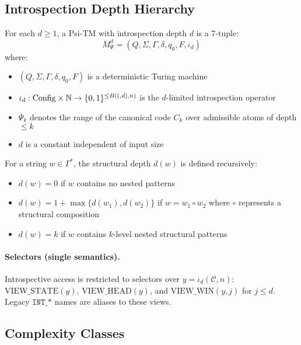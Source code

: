 \subsection{Introspection Depth Hierarchy}

\begin{definition}
For each $d \geq 1$, a Psi-TM with introspection depth $d$ is a 7-tuple:
$$M_\Psi^d = (Q, \Sigma, \Gamma, \delta, q_0, F, \iota_d)$$
where:
\begin{itemize}
\item $(Q, \Sigma, \Gamma, \delta, q_0, F)$ is a deterministic Turing machine
\item $\iota_d: \mathrm{Config}\times \mathbb{N} \to \{0,1\}^{\le B((,d),n)}$ is the $d$-limited introspection operator
\item $\Psi_k$ denotes the range of the canonical code $C_k$ over admissible atoms of depth $\le k$
\item $d$ is a constant independent of input size
\end{itemize}
\end{definition}

\begin{definition}
For a string $w \in \Gamma^*$, the structural depth $d(w)$ is defined recursively:
\begin{itemize}
\item $d(w) = 0$ if $w$ contains no nested patterns
\item $d(w) = 1 + \max\{d(w_1), d(w_2)\}$ if $w = w_1 \circ w_2$ where $\circ$ represents a structural composition
\item $d(w) = k$ if $w$ contains $k$-level nested structural patterns
\end{itemize}
\end{definition}

\paragraph{Selectors (single semantics).} Introspective access is restricted to selectors over $y=\iota_d(\mathcal{C},n)$: $\mathrm{VIEW\_STATE}(y)$, $\mathrm{VIEW\_HEAD}(y)$, and $\mathrm{VIEW\_WIN}(y,j)$ for $j\le d$. Legacy $\texttt{INT\_*}$ names are aliases to these views.

\subsection{Complexity Classes}

